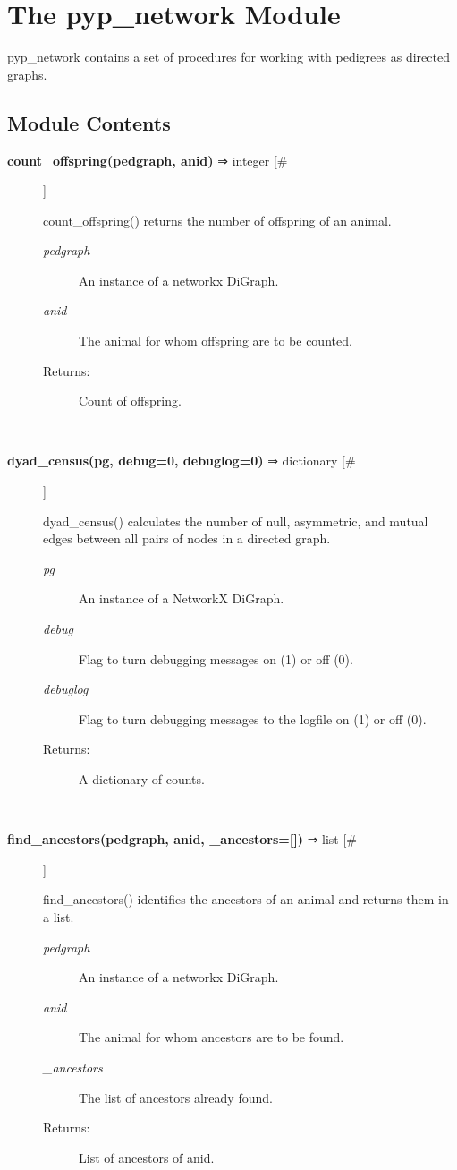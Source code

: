 \documentclass{article}
\begin{document}
\section*{The pyp\_network Module}
\par pyp\_network contains a set of procedures for working with pedigrees as directed
graphs.
\subsection*{Module Contents}
\begin{description}
\item[\textbf{count\_offspring(pedgraph, anid)} ⇒ integer [\#]
]
\par count\_offspring() returns the number of offspring of an animal.
\begin{description}
\item[\textit{pedgraph}
]
An instance of a networkx DiGraph.
\item[\textit{anid}
]
The animal for whom offspring are to be counted.
\item[Returns:
]
Count of offspring.
\end{description}\\

\item[\textbf{dyad\_census(pg, debug=0, debuglog=0)} ⇒ dictionary [\#]
]
\par dyad\_census() calculates the number of null, asymmetric, and
mutual edges between all pairs of nodes in a directed graph.
\begin{description}
\item[\textit{pg}
]
An instance of a NetworkX DiGraph.
\item[\textit{debug}
]
Flag to turn debugging messages on (1) or off (0).
\item[\textit{debuglog}
]
Flag to turn debugging messages to the logfile  on (1) or off (0).
\item[Returns:
]
A dictionary of counts.
\end{description}\\

\item[\textbf{find\_ancestors(pedgraph, anid, \_ancestors=[])} ⇒ list [\#]
]
\par find\_ancestors() identifies the ancestors of an animal and returns them in a list.
\begin{description}
\item[\textit{pedgraph}
]
An instance of a networkx DiGraph.
\item[\textit{anid}
]
The animal for whom ancestors are to be found.
\item[\textit{\_ancestors}
]
The list of ancestors already found.
\item[Returns:
]
List of ancestors of anid.
\end{description}\\


\end{description}
\end{document}
